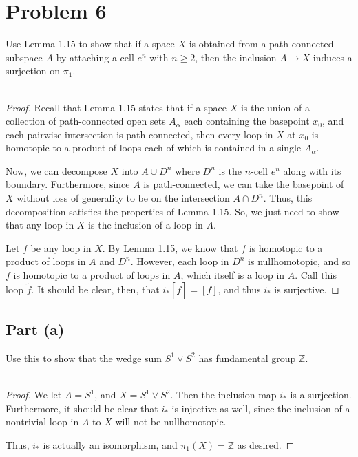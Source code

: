 \documentclass[fontsize=11pt]{scrartcl} %
\numberwithin{equation}{section} %
\numberwithin{figure}{section} %
\numberwithin{table}{section} %
\newcommand{\Z}{\mathbb{Z}}
\begin{document}
\section*{Problem 6}
Use Lemma 1.15 to show that if a space $X$ is obtained from a path-connected
subspace $A$ by attaching a cell $e^n$ with $n\geq 2$, then the inclusion $A\to
X$ induces a surjection on $\pi_1$.
\\
\\
\begin{proof}
    Recall that Lemma 1.15 states that if a space $X$ is the union of a
    collection of path-connected open sets $A_{\alpha}$ each containing the
    basepoint $x_0$, and each pairwise intersection is path-connected, then
    every loop in $X$ at $x_0$ is homotopic to a product of loops each of which
    is contained in a single $A_{\alpha}$.

    Now, we can decompose $X$ into $A\cup D^n$ where $D^n$ is the $n$-cell $e^n$
    along with its boundary. Furthermore, since $A$ is path-connected, we can
    take the basepoint of $X$ without loss of generality to be on the
    intersection $A\cap D^n$. Thus, this decomposition satisfies the properties
    of Lemma 1.15. So, we just need to show that any loop in $X$ is the
    inclusion of a loop in $A$.

    Let $f$ be any loop in $X$. By Lemma 1.15, we know that $f$ is homotopic to
    a product of loops in $A$ and $D^n$. However, each loop in $D^n$ is
    nullhomotopic, and so $f$ is homotopic to a product of loops in $A$, which
    itself is a loop in $A$. Call this loop $\tilde{f}$. It should be clear,
    then, that $i_*[\tilde{f}] = [f]$, and thus $i_*$ is surjective.
\end{proof}
\subsection*{Part (a)}
Use this to show that the wedge sum $S^1\vee S^2$ has fundamental group $\Z$.
\\
\\
\begin{proof}
    We let $A=S^1$, and $X=S^1\vee S^2$. Then the inclusion map $i_*$ is a
    surjection. Furthermore, it should be clear that $i_*$ is injective as well,
    since the inclusion of a nontrivial loop in $A$ to $X$ will not be
    nullhomotopic.
    
    Thus, $i_*$ is actually an isomorphism, and $\pi_1(X) = \Z$ as desired.
\end{proof}
\end{document}
